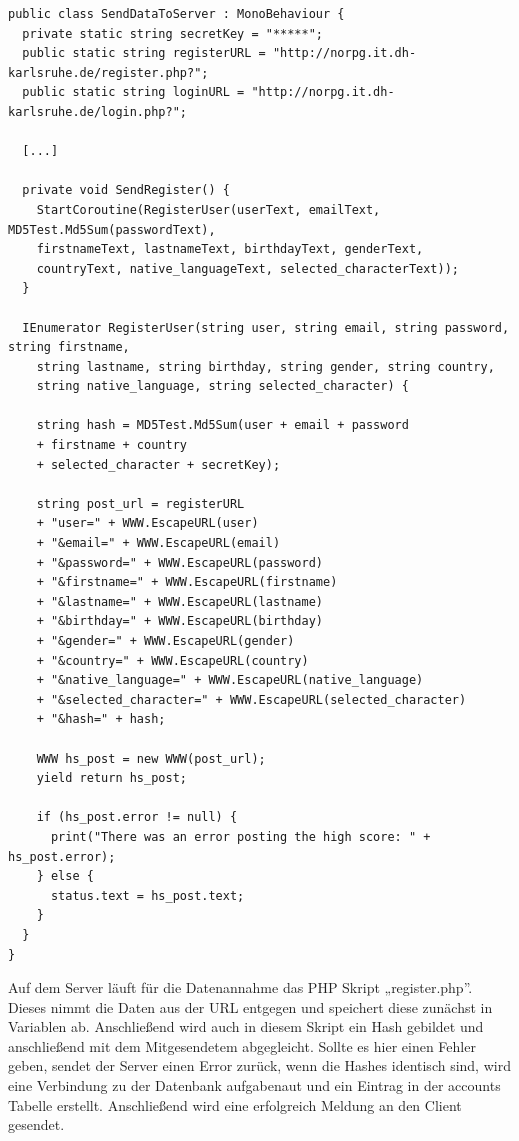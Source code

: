 			\begin{scriptsize}
				\lstset{
					float,
					caption=Skript SendDataToServer.cs, 
					language=[Sharp]C, 
					frame=single,  
					showstringspaces=false, 
					showspaces=false, 
					numbers=left, 
					captionpos=b, 
					belowcaptionskip=4pt,
					basicstyle=\ttfamily
				} 
				\begin{lstlisting}[label=lst:c_SendDataToServer]
public class SendDataToServer : MonoBehaviour {
  private static string secretKey = "*****";
  public static string registerURL = "http://norpg.it.dh-karlsruhe.de/register.php?";
  public static string loginURL = "http://norpg.it.dh-karlsruhe.de/login.php?";

  [...]
	
  private void SendRegister() {
    StartCoroutine(RegisterUser(userText, emailText, MD5Test.Md5Sum(passwordText), 
    firstnameText, lastnameText, birthdayText, genderText, 
    countryText, native_languageText, selected_characterText));
  }
	
  IEnumerator RegisterUser(string user, string email, string password, string firstname, 
    string lastname, string birthday, string gender, string country, 
    string native_language, string selected_character) {
	
    string hash = MD5Test.Md5Sum(user + email + password 
    + firstname + country 
    + selected_character + secretKey);

    string post_url = registerURL
    + "user=" + WWW.EscapeURL(user)
    + "&email=" + WWW.EscapeURL(email)
    + "&password=" + WWW.EscapeURL(password)
    + "&firstname=" + WWW.EscapeURL(firstname)
    + "&lastname=" + WWW.EscapeURL(lastname)
    + "&birthday=" + WWW.EscapeURL(birthday)
    + "&gender=" + WWW.EscapeURL(gender)
    + "&country=" + WWW.EscapeURL(country)
    + "&native_language=" + WWW.EscapeURL(native_language)
    + "&selected_character=" + WWW.EscapeURL(selected_character)
    + "&hash=" + hash;
    
    WWW hs_post = new WWW(post_url);
    yield return hs_post;

    if (hs_post.error != null) {
      print("There was an error posting the high score: " + hs_post.error);
    } else {
      status.text = hs_post.text;
    }
  }
}
				\end{lstlisting}
			\end{scriptsize}

			Auf dem Server läuft für die Datenannahme das PHP Skript „register.php”. Dieses nimmt die Daten aus der URL entgegen und speichert diese zunächst in Variablen ab. Anschließend wird auch in diesem Skript ein Hash gebildet und anschließend mit dem Mitgesendetem abgegleicht. Sollte es hier einen Fehler geben, sendet der Server einen Error zurück, wenn die Hashes identisch sind, wird eine Verbindung zu der Datenbank aufgabenaut und ein Eintrag in der accounts Tabelle erstellt. Anschließend wird eine erfolgreich Meldung an den Client gesendet.


